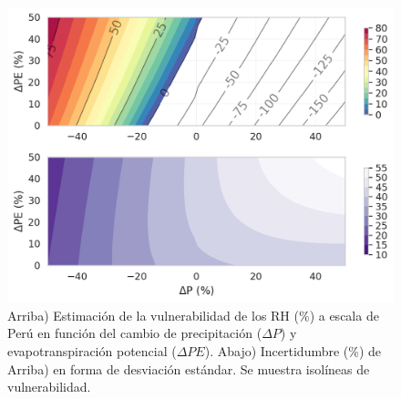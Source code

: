\begin{figure}[ht!]
	\includegraphics[scale=.95]{Images/12_VI_PERU_scale.png}
	\centering
	\caption{Arriba) Estimación de la vulnerabilidad de los RH (\%) a escala de Perú en función del cambio de precipitación ($\Delta P$) y evapotranspiración potencial ($\Delta PE$). Abajo) Incertidumbre (\%) de Arriba) en forma de desviación estándar. Se muestra isolíneas de vulnerabilidad.}
	\label{fig:12_VI_PERU_scale}
\end{figure}
